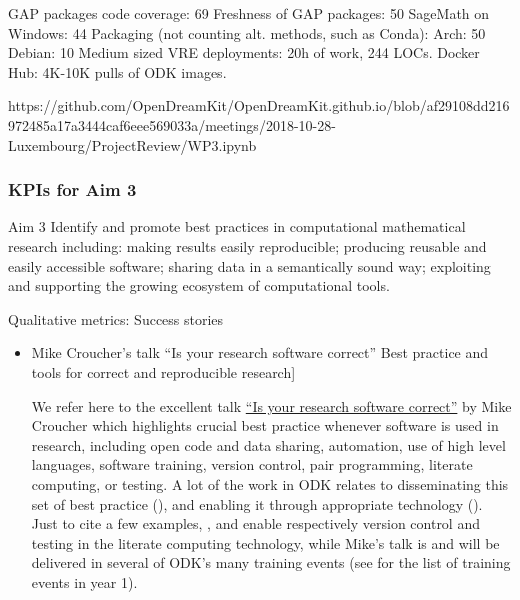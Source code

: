 \begin{Aim 1}
\begin{Aim 2}
GAP packages code coverage: 69%
Freshness of GAP packages: 50%
SageMath on Windows: 44%
Packaging (not counting alt. methods, such as Conda):
Arch: 50%
Debian: 10%
Medium sized VRE deployments: 20h of work, 244 LOCs.
Docker Hub: 4K-10K pulls of ODK images.

https://github.com/OpenDreamKit/OpenDreamKit.github.io/blob/af29108dd216972485a17a3444caf6eee569033a/meetings/2018-10-28-Luxembourg/ProjectReview/WP3.ipynb

 

\subsubsection{KPIs for Aim 3}

\begin{recommendation}{Aim 3}
  Identify and promote best practices in computational mathematical
  research including: making results easily reproducible; producing
  reusable and easily accessible software; sharing data in a
  semantically sound way; exploiting and supporting the growing
  ecosystem of computational tools.
\end{recommendation}

Qualitative metrics: Success stories
\begin{itemize}
\item Mike Croucher's talk ``Is your research software correct''
Best practice and tools for correct and reproducible research]
         
         We refer here to the excellent talk
\href{https://mikecroucher.github.io/MLPM_talk/}{``Is your research software correct''} by Mike Croucher which highlights crucial best 
practice whenever software is used in research, including open code and data sharing, automation, use of high level languages, software 
training, version control, pair programming, literate computing, or testing. A lot of the work in ODK relates to disseminating this set of 
best practice (), and enabling it through appropriate technology ().  Just to cite a few examples, 
, and  enable respectively version control and testing in the \Jupyter 
literate computing technology, while Mike's talk is and will be delivered in several of ODK's many training events (see 
 for the list of training events in year 1).



\end{itemize}
\end{Aim 2}
\end{Aim 1}
